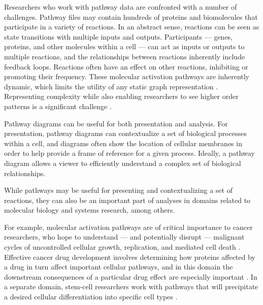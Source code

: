 \documentclass[review,journal]{vgtc}         %
\newcommand*{\p}[1]{\paragraph{\textbf{#1}}}
\begin{document}

Researchers who work with pathway data are confronted with a number of challenges. Pathway files may contain hundreds of proteins and biomolecules that participate in a variety of reactions. In an abstract sense, reactions can be seen as state transitions with multiple inputs and outputs. Participants --- genes, proteins, and other molecules within a cell --- can act as inputs or outputs to multiple reactions, and the relationships between reactions inherently include feedback loops. Reactions often have an effect on other reactions, inhibiting or promoting their frequency. These molecular activation pathways are inherently dynamic, which limits the utility of any static graph representation \cite{kitano2002systems}. Representing complexity while also enabling researchers to see higher order patterns is a significant challenge \cite{saraiya2005visualizing}.


Pathway diagrams can be useful for both presentation and analysis. For presentation, pathway diagrams can contextualize a set of biological processes within a cell, and diagrams often show the location of cellular membranes in order to help provide a frame of reference for a given process. Ideally, a pathway diagram allows a viewer to efficiently understand a complex set of biological relationships.


While pathways may be useful for presenting and contextualizing a set of reactions, they can also be an important part of analyses in domains related to molecular biology and systems research, among others.


For example, molecular activation pathways are of critical importance to cancer researchers, who hope to understand --- and potentially disrupt --- malignant cycles of uncontrolled cellular growth, replication, and mediated cell death \cite{cairns2011regulation}. Effective cancer drug development involves determining how proteins affected by a drug in turn affect important cellular pathways, and in this domain the downstream consequences of a particular drug effect are especially important \cite{luo2003targeting}. In a separate domain, stem-cell researchers work with pathways that will precipitate a desired cellular differentiation into specific cell types \cite{reya2001stem}.
\end{document}

